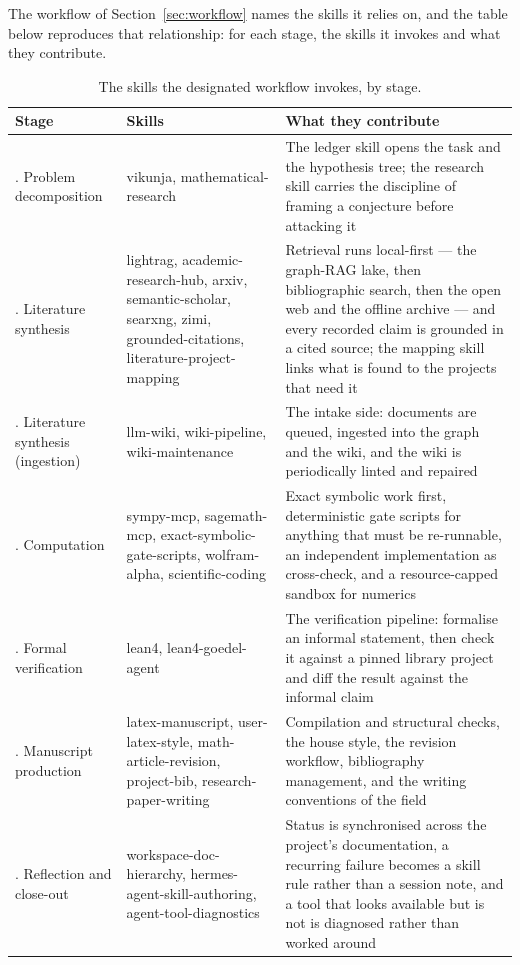 \documentclass[10pt]{article}
\begin{document}
The workflow of Section~\ref{sec:workflow} names the skills it relies on, and the table below
reproduces that relationship: for each stage, the skills it invokes and what they contribute.

\begin{table}[htbp]
\centering\small
\caption{The skills the designated workflow invokes, by stage.}\label{tab:skillstages}
\renewcommand{\arraystretch}{1.15}
\begin{tabularx}{\textwidth}{@{}>{\raggedright\arraybackslash}p{3.2cm} >{\raggedright\arraybackslash}p{3.9cm} X@{}}
\toprule
\textbf{Stage} & \textbf{Skills} & \textbf{What they contribute} \\
\midrule
1. Problem decomposition & vikunja, mathematical-research & The ledger skill opens the task and the hypothesis tree; the research skill carries the discipline of framing a conjecture before attacking it \\
2. Literature synthesis & lightrag, academic-research-hub, arxiv, semantic-scholar, searxng, zimi, grounded-citations, literature-project-mapping & Retrieval runs local-first --- the graph-RAG lake, then bibliographic search, then the open web and the offline archive --- and every recorded claim is grounded in a cited source; the mapping skill links what is found to the projects that need it \\
2. Literature synthesis (ingestion) & llm-wiki, wiki-pipeline, wiki-maintenance & The intake side: documents are queued, ingested into the graph and the wiki, and the wiki is periodically linted and repaired \\
3. Computation & sympy-mcp, sagemath-mcp, exact-symbolic-gate-scripts, wolfram-alpha, scientific-coding & Exact symbolic work first, deterministic gate scripts for anything that must be re-runnable, an independent implementation as cross-check, and a resource-capped sandbox for numerics \\
4. Formal verification & lean4, lean4-goedel-agent & The verification pipeline: formalise an informal statement, then check it against a pinned library project and diff the result against the informal claim \\
5. Manuscript production & latex-manuscript, user-latex-style, math-article-revision, project-bib, research-paper-writing & Compilation and structural checks, the house style, the revision workflow, bibliography management, and the writing conventions of the field \\
6. Reflection and close-out & workspace-doc-hierarchy, hermes-agent-skill-authoring, agent-tool-diagnostics & Status is synchronised across the project's documentation, a recurring failure becomes a skill rule rather than a session note, and a tool that looks available but is not is diagnosed rather than worked around \\
\bottomrule
\end{tabularx}
\end{table}
\end{document}
